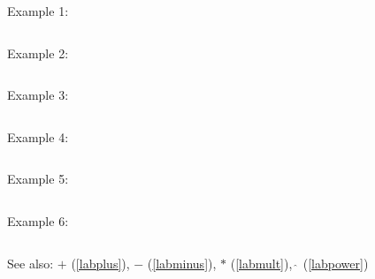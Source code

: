 \noindent Example 1: 
\begin{center}\begin{minipage}{15cm}\begin{Verbatim}[frame=single]
\end{Verbatim}
\end{minipage}\end{center}
\noindent Example 2: 
\begin{center}\begin{minipage}{15cm}\begin{Verbatim}[frame=single]
\end{Verbatim}
\end{minipage}\end{center}
\noindent Example 3: 
\begin{center}\begin{minipage}{15cm}\begin{Verbatim}[frame=single]
\end{Verbatim}
\end{minipage}\end{center}
\noindent Example 4: 
\begin{center}\begin{minipage}{15cm}\begin{Verbatim}[frame=single]
\end{Verbatim}
\end{minipage}\end{center}
\noindent Example 5: 
\begin{center}\begin{minipage}{15cm}\begin{Verbatim}[frame=single]
\end{Verbatim}
\end{minipage}\end{center}
\noindent Example 6: 
\begin{center}\begin{minipage}{15cm}\begin{Verbatim}[frame=single]
\end{Verbatim}
\end{minipage}\end{center}
See also: \textbf{$+$} (\ref{labplus}), \textbf{$-$} (\ref{labminus}), \textbf{$*$} (\ref{labmult}), \textbf{$\mathbf{\hat{~}}$} (\ref{labpower})
